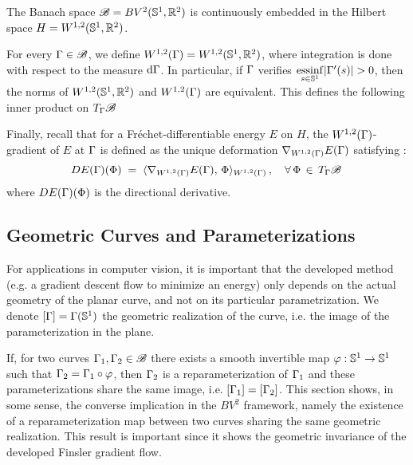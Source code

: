 \begin{defn}\label{hilbert-struct}
The Banach space $\mathcal{B}=BV^2(\mathbb{S}^1,\mathbb{R}^2)$ is continuously embedded in the  Hilbert space $H =W^{1,2}(\mathbb{S}^1,\mathbb{R}^2)$. 

For every $\Gamma\in \mathcal{B}$, we define $W^{1,2}(\Gamma) = W^{1,2}(\mathbb{S}^1, \mathbb{R}^2)$, where integration is done with respect to the measure $\mathrm{d} \Gamma$. In particular, if $\Gamma$ verifies $\underset{s\in\Circ}{{\rm essinf}}|\GA'(s)|> 0$, then the norms of $W^{1,2}(\mathbb{S}^1, \mathbb{R}^2)$ and $W^{1,2}(\Gamma)$ are equivalent.  
This defines the following inner product on $T_\Gamma \mathcal{B}$

\end{defn}


Finally, recall that for a Fr\'echet-differentiable energy $E$ on $H$, the $W^{1,2}(\Gamma)$-gradient of $E$ at $\Gamma$ is defined as the unique deformation $\nabla_{W^{1,2}(\Gamma)} E(\Gamma)$ satisfying :
$$D E(\Gamma)(\Phi) \; = \; \langle\nabla_{W^{1,2}(\Gamma)} E(\Gamma),\,\Phi\rangle_{W^{1,2}(\Gamma)}\,, \quad  \forall \, \Phi\, \in\, T_\Gamma\mathcal{B}\, $$
where $D E(\Gamma)(\Phi)$ is the directional derivative. 


\subsection{Geometric Curves and Parameterizations}\label{repa}

For applications in computer vision, it is important that the developed method (e.g. a gradient descent flow to minimize an energy) only depends on the actual geometry of the planar curve, and not on its particular parametrization. We denote $[\Gamma] = \Gamma(\mathbb{S}^1)$ the geometric realization of the curve, i.e. the image of the parameterization in the plane.

If, for two curves $\Gamma_1,\Gamma_2 \in \mathcal{B}$ there exists a smooth invertible map $\varphi:\mathbb{S}^1 \to \mathbb{S}^1$ such that $\Gamma_2 = \Gamma_1 \circ \varphi$, then $\Gamma_2$ is a reparameterization of $\Gamma_1$ and these parameterizations share the same image, i.e. $[\Gamma_1] = [\Gamma_2]$. This section shows, in some sense, the converse implication in the $BV^2$ framework, namely the existence of a reparameterization map between two curves sharing the same geometric realization. This result is important since it shows the geometric invariance of the developed Finsler gradient flow. 

